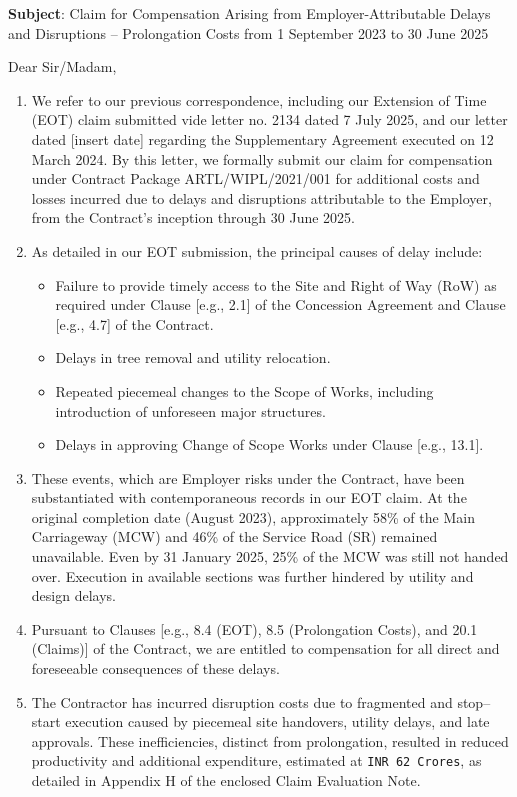 \documentclass[12pt,letterpaper]{article}
\begin{document}
	

	
	\textbf{Subject}: Claim for Compensation Arising from Employer-Attributable Delays and Disruptions -- Prolongation Costs from 1 September 2023 to 30 June 2025
	
	Dear Sir/Madam,
	
	\begin{enumerate}
		\item We refer to our previous correspondence, including our Extension of Time (EOT) claim submitted vide letter no. 2134 dated 7 July 2025, and our letter dated [insert date] regarding the Supplementary Agreement executed on 12 March 2024. By this letter, we formally submit our claim for compensation under Contract Package ARTL/WIPL/2021/001 for additional costs and losses incurred due to delays and disruptions attributable to the Employer, from the Contract’s inception through 30 June 2025.
		\item As detailed in our EOT submission, the principal causes of delay include:
		\begin{itemize}
			\item Failure to provide timely access to the Site and Right of Way (RoW) as required under Clause [e.g., 2.1] of the Concession Agreement and Clause [e.g., 4.7] of the Contract.
			\item Delays in tree removal and utility relocation.
			\item Repeated piecemeal changes to the Scope of Works, including introduction of unforeseen major structures.
			\item Delays in approving Change of Scope Works under Clause [e.g., 13.1].
		\end{itemize}
		\item These events, which are Employer risks under the Contract, have been substantiated with contemporaneous records in our EOT claim. At the original completion date (August 2023), approximately 58\% of the Main Carriageway (MCW) and 46\% of the Service Road (SR) remained unavailable. Even by 31 January 2025, 25\% of the MCW was still not handed over. Execution in available sections was further hindered by utility and design delays.
		\item Pursuant to Clauses [e.g., 8.4 (EOT), 8.5 (Prolongation Costs), and 20.1 (Claims)] of the Contract, we are entitled to compensation for all direct and foreseeable consequences of these delays.
		\item The Contractor has incurred disruption costs due to fragmented and stop--start execution caused by piecemeal site handovers, utility delays, and late approvals. These inefficiencies, distinct from prolongation, resulted in reduced productivity and additional expenditure, estimated at \texttt{INR 62 Crores}, as detailed in Appendix H of the enclosed Claim Evaluation Note.

\end{enumerate}
\end{document}
